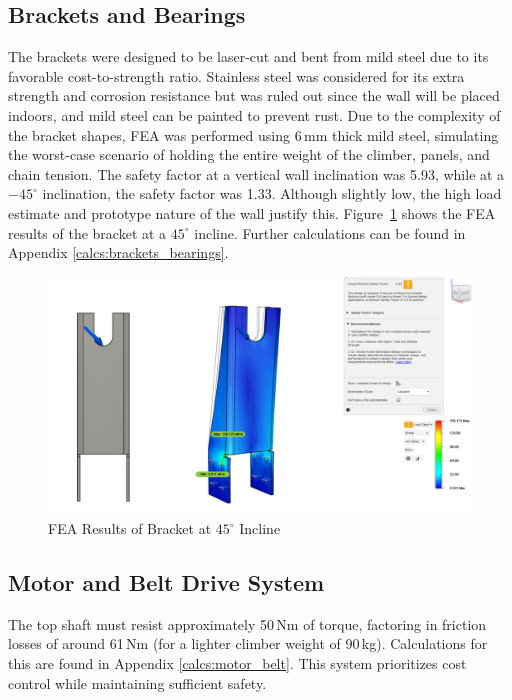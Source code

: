 \subsection{Brackets and Bearings}

The brackets were designed to be laser-cut and bent from mild steel due to its favorable cost-to-strength ratio. Stainless steel was considered for its extra strength and corrosion resistance but was ruled out since the wall will be placed indoors, and mild steel can be painted to prevent rust. Due to the complexity of the bracket shapes, FEA was performed using 6\,mm thick mild steel, simulating the worst-case scenario of holding the entire weight of the climber, panels, and chain tension. The safety factor at a vertical wall inclination was 5.93, while at a $-45^\circ$ inclination, the safety factor was 1.33. Although slightly low, the high load estimate and prototype nature of the wall justify this. Figure~\ref{fig:FEM-bracket} shows the FEA results of the bracket at a $45^\circ$ incline. Further calculations can be found in Appendix \ref{calcs:brackets_bearings}.

\begin{figure}[ht]
    \centering
    \includegraphics[width=0.8\linewidth]{figs/final_design/FEMBracket45.png}
    \caption{FEA Results of Bracket at $45^\circ$ Incline}
    \label{fig:FEM-bracket}
\end{figure}

\subsection{Motor and Belt Drive System}

The top shaft must resist approximately 50\,Nm of torque, factoring in friction losses of around 61\,Nm (for a lighter climber weight of 90\,kg). Calculations for this are found in Appendix \ref{calcs:motor_belt}. This system prioritizes cost control while maintaining sufficient safety.

